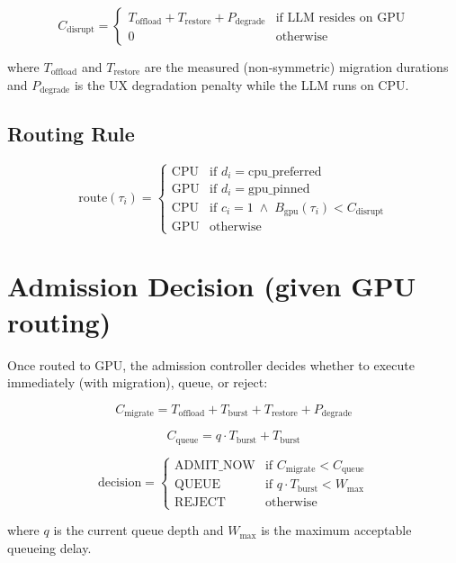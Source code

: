 \documentclass{article}
\begin{document}
\begin{equation}
C_{\text{disrupt}} = \begin{cases}
    T_{\text{offload}} + T_{\text{restore}} + P_{\text{degrade}}
        & \text{if LLM resides on GPU} \\[4pt]
    0   & \text{otherwise}
\end{cases}
\end{equation}

where $T_{\text{offload}}$ and $T_{\text{restore}}$ are the measured
(non-symmetric) migration durations and $P_{\text{degrade}}$ is the UX
degradation penalty while the LLM runs on CPU.

\subsection*{Routing Rule}

\begin{equation}
\text{route}(\tau_i) = \begin{cases}
    \text{CPU} & \text{if } d_i = \text{cpu\_preferred} \\[4pt]
    \text{GPU} & \text{if } d_i = \text{gpu\_pinned} \\[4pt]
    \text{CPU} & \text{if } c_i = 1 \;\wedge\; B_{\text{gpu}}(\tau_i) < C_{\text{disrupt}} \\[4pt]
    \text{GPU} & \text{otherwise}
\end{cases}
\end{equation}

\section*{Admission Decision (given GPU routing)}

Once routed to GPU, the admission controller decides whether to execute
immediately (with migration), queue, or reject:

\begin{equation}
C_{\text{migrate}} = T_{\text{offload}} + T_{\text{burst}} + T_{\text{restore}} + P_{\text{degrade}}
\end{equation}

\begin{equation}
C_{\text{queue}} = q \cdot T_{\text{burst}} + T_{\text{burst}}
\end{equation}

\begin{equation}
\text{decision} = \begin{cases}
    \text{ADMIT\_NOW}  & \text{if } C_{\text{migrate}} < C_{\text{queue}} \\[4pt]
    \text{QUEUE}       & \text{if } q \cdot T_{\text{burst}} < W_{\max} \\[4pt]
    \text{REJECT}      & \text{otherwise}
\end{cases}
\end{equation}

where $q$ is the current queue depth and $W_{\max}$ is the maximum acceptable
queueing delay.
\end{document}
